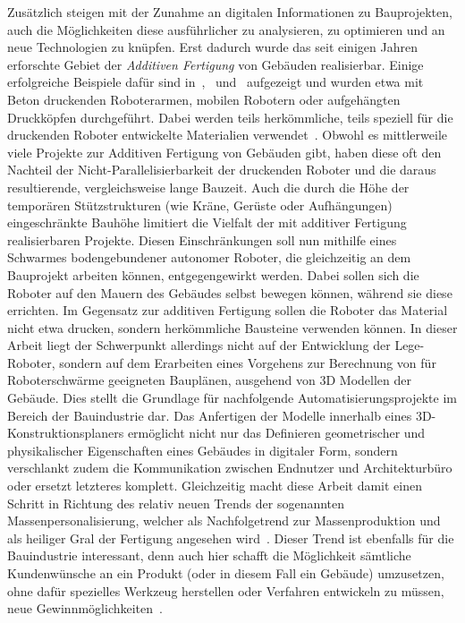 Zusätzlich steigen mit der Zunahme an digitalen Informationen zu Bauprojekten, auch die Möglichkeiten diese ausführlicher zu analysieren, zu optimieren und an neue Technologien zu knüpfen.
Erst dadurch wurde das seit einigen Jahren erforschte Gebiet der \textit{Additiven Fertigung} von Gebäuden realisierbar.
Einige erfolgreiche Beispiele dafür sind in~\cite{AdditiveManufactoringDelgado},~\cite{AdditiveManufacturingUsingMobileRobots} und~\cite{Tankova2020} aufgezeigt und wurden etwa mit Beton druckenden Roboterarmen, mobilen Robotern oder aufgehängten Druckköpfen durchgeführt.
Dabei werden teils herkömmliche, teils speziell für die druckenden Roboter entwickelte Materialien verwendet~\cite{Tankova2020}.
Obwohl es mittlerweile viele Projekte zur Additiven Fertigung von Gebäuden gibt, haben diese oft den Nachteil der Nicht-Parallelisierbarkeit der druckenden Roboter und die daraus resultierende, vergleichsweise lange Bauzeit.
Auch die durch die Höhe der temporären Stützstrukturen (wie Kräne, Gerüste oder Aufhängungen) eingeschränkte Bauhöhe limitiert die Vielfalt der mit additiver Fertigung realisierbaren Projekte.
Diesen Einschränkungen soll nun mithilfe eines Schwarmes bodengebundener autonomer Roboter, die gleichzeitig an dem Bauprojekt arbeiten können, entgegengewirkt werden.
Dabei sollen sich die Roboter auf den Mauern des Gebäudes selbst bewegen können, während sie diese errichten.
Im Gegensatz zur additiven Fertigung sollen die Roboter das Material nicht etwa drucken, sondern herkömmliche Bausteine verwenden können.
In dieser Arbeit liegt der Schwerpunkt allerdings nicht auf der Entwicklung der Lege-Roboter, sondern auf dem Erarbeiten eines Vorgehens zur Berechnung von für Roboterschwärme geeigneten Bauplänen, ausgehend von 3D Modellen der Gebäude.
Dies stellt die Grundlage für nachfolgende Automatisierungsprojekte im Bereich der Bauindustrie dar.
Das Anfertigen der Modelle innerhalb eines 3D-Konstruktionsplaners ermöglicht nicht nur das Definieren geometrischer und physikalischer Eigenschaften eines Gebäudes in digitaler Form, sondern verschlankt zudem die Kommunikation zwischen Endnutzer und Architekturbüro oder ersetzt letzteres komplett.
Gleichzeitig macht diese Arbeit damit einen Schritt in Richtung des relativ neuen Trends der sogenannten Massenpersonalisierung, welcher als Nachfolgetrend zur Massenproduktion und als \glqq{}heiliger Gral\grqq{} der Fertigung angesehen wird~\cite{MassCustomHolyGrail}.
Dieser Trend ist ebenfalls für die Bauindustrie interessant, denn auch hier schafft die Möglichkeit sämtliche Kundenwünsche an ein Produkt (oder in diesem Fall ein Gebäude) umzusetzen, ohne dafür spezielles Werkzeug herstellen oder Verfahren entwickeln zu müssen, neue Gewinnmöglichkeiten~\cite{Jensen2018}\cite{Jensen2015}.
